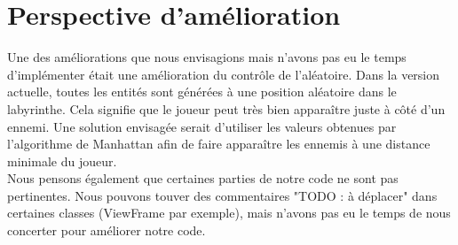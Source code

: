 \documentclass[a4paper]{article}
\begin{document}
\section{Perspective d'amélioration}

Une des améliorations que nous envisagions mais n'avons pas eu le temps
d'implémenter était une amélioration du contrôle de l'aléatoire. Dans la version
actuelle, toutes les entités sont générées à une position aléatoire dans le
labyrinthe. Cela signifie que le joueur peut très bien apparaître juste à côté
d'un ennemi. Une solution envisagée serait d'utiliser les valeurs obtenues par
l'algorithme de Manhattan afin de faire apparaître les ennemis à une distance
minimale du joueur. \\
Nous pensons également que certaines parties de notre code ne sont pas
pertinentes. Nous pouvons touver des commentaires "TODO : à déplacer" dans
certaines classes (ViewFrame par exemple), mais n'avons pas eu le temps de
nous concerter pour améliorer notre code.

\end{document}
